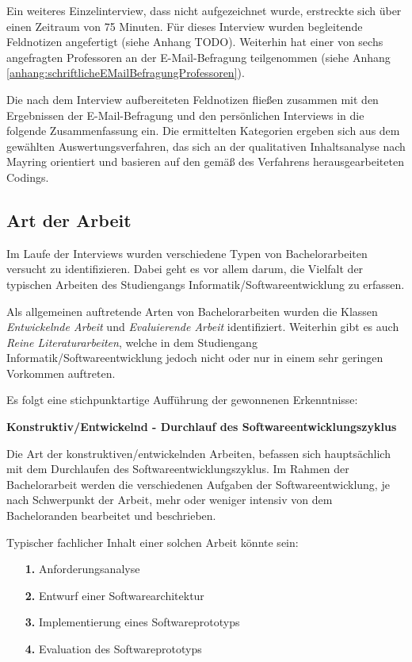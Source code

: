 \documentclass[bibliography=totoc,listof=totoc,BCOR=5mm,DIV=12,oneside]{scrbook}
\begin{document}
\par \bigskip Ein weiteres Einzelinterview, dass nicht aufgezeichnet wurde, erstreckte sich über einen Zeitraum von 75 Minuten. Für dieses Interview wurden begleitende Feldnotizen angefertigt (siehe Anhang TODO). Weiterhin hat einer von sechs angefragten Professoren an der E-Mail-Befragung teilgenommen (siehe Anhang \ref{anhang:schriftlicheEMailBefragungProfessoren}).

\par \bigskip Die nach dem Interview aufbereiteten Feldnotizen fließen zusammen mit den Ergebnissen der E-Mail-Befragung und den persönlichen Interviews in die folgende Zusammenfassung ein. Die ermittelten Kategorien ergeben sich aus dem gewählten Auswertungsverfahren, das sich an der qualitativen Inhaltsanalyse nach Mayring\citep{Mayring2015} orientiert und basieren auf den gemäß des Verfahrens herausgearbeiteten Codings.

\newpage
\subsection{Art der Arbeit}
\par Im Laufe der Interviews wurden verschiedene Typen von Bachelorarbeiten versucht zu identifizieren. Dabei geht es vor allem darum, die Vielfalt der typischen Arbeiten des Studiengangs Informatik/Softwareentwicklung zu erfassen.
\par \bigskip Als allgemeinen auftretende Arten von Bachelorarbeiten wurden die Klassen \textit{Entwickelnde Arbeit}  und \textit{Evaluierende Arbeit} identifiziert. Weiterhin gibt es auch \textit{Reine Literaturarbeiten}, welche in dem Studiengang Informatik/Softwareentwicklung jedoch nicht oder nur in einem sehr geringen Vorkommen auftreten.

\par \bigskip Es folgt eine stichpunktartige Aufführung der gewonnenen Erkenntnisse:

\par \bigskip \textbf{Konstruktiv/Entwickelnd - Durchlauf des Softwareentwicklungszyklus}
\par \bigskip Die Art der konstruktiven/entwickelnden Arbeiten, befassen sich hauptsächlich mit dem Durchlaufen des Softwareentwicklungszyklus. Im Rahmen der Bachelorarbeit werden die verschiedenen Aufgaben der Softwareentwicklung, je nach Schwerpunkt der Arbeit, mehr oder weniger intensiv von dem Bacheloranden bearbeitet und beschrieben.
\par \medskip Typischer fachlicher Inhalt einer solchen Arbeit könnte sein:
\begin{itemize}
\item[\textbf{1.}] Anforderungsanalyse
\item[\textbf{2.}] Entwurf einer Softwarearchitektur
\item[\textbf{3.}] Implementierung eines Softwareprototyps
\item[\textbf{4.}] Evaluation des Softwareprototyps
\end{itemize}
\end{document}
